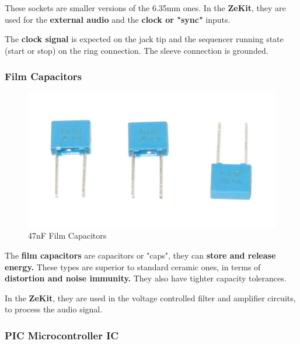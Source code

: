 \documentclass{scrartcl}
\begin{document}
These sockets are smaller versions of the 6.35mm ones. In the \textbf{ZeKit}, they are used for the \textbf{external audio} and the \textbf{clock or "sync"} inputs.

The \textbf{clock signal} is expected on the jack tip and the sequencer running state (start or stop) on the ring connection. The sleeve connection is grounded.

\subsubsection{Film Capacitors}

\begin{figure}[!ht]
    \begin{center}
        \includegraphics[scale=0.15]{assets/zekit-caps.jpg}
        \caption{47nF Film Capacitors}
    \end{center}
\end{figure}

The \textbf{film capacitors} are capacitors or "caps", they can \textbf{store and release energy.} These types are superior to standard ceramic ones, in terms of \textbf{distortion and noise immunity.}
They also have tighter capacity tolerances.

In the \textbf{ZeKit}, they are used in the voltage controlled filter and amplifier circuits, to process the audio signal.

\pagebreak
\subsubsection{PIC Microcontroller IC}
\end{document}
